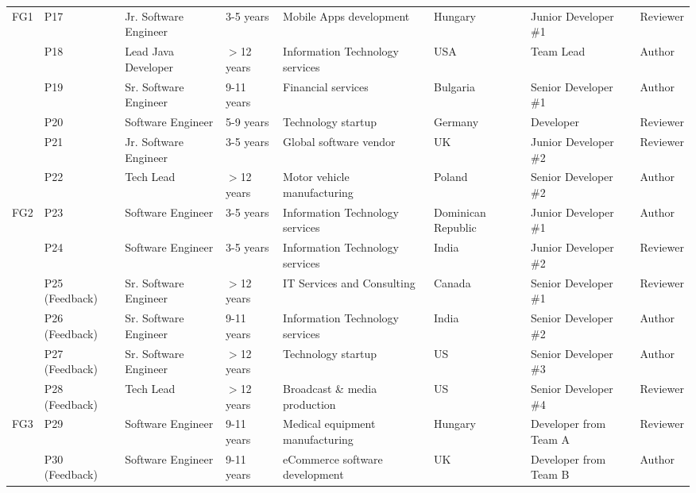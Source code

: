 {\begin{landscape}
\begin{longtable}{clp{2.5cm}lllp{3.1cm}l}
         \multirow{6}{*}{FG1} & P17 & Jr. Software Engineer & 3-5 years & Mobile Apps development & Hungary & Junior Developer \#1 & Reviewer\\ 
                              & P18 & Lead Java Developer & $>$12 years & Information Technology services & USA & Team Lead & Author\\ 
                              & P19 & Sr. Software Engineer & 9-11 years & Financial services & Bulgaria & Senior Developer \#1 & Author\\ 
                              & P20 & Software Engineer & 5-9 years & Technology startup & Germany & Developer & Reviewer\\ 
                              & P21 & Jr. Software Engineer & 3-5 years & Global software vendor & UK & Junior Developer \#2 & Reviewer\\ 
                              & P22 & Tech Lead & $>$12 years & Motor vehicle manufacturing & Poland & Senior Developer \#2 & Author\\  \hline
         \multirow{6}{*}{FG2} & P23 & Software Engineer & 3-5 years & Information Technology services & Dominican Republic & Junior Developer \#1 & Author\\ 
                              & P24 & Software Engineer & 3-5 years & Information Technology services & India & Junior Developer \#2 & Reviewer\\ 
                              & P25 (Feedback)& Sr. Software Engineer & $>$12 years & IT Services and Consulting & Canada & Senior Developer \#1 & Reviewer\\ 
                              & P26 (Feedback)& Sr. Software Engineer & 9-11 years & Information Technology services & India & Senior Developer \#2 & Author\\ 
                              & P27 (Feedback)& Sr. Software Engineer & $>$12 years & Technology startup & US & Senior Developer \#3 & Author\\ 
                              & P28 (Feedback)& Tech Lead & $>$12 years & Broadcast  \& media production & US & Senior Developer \#4 & Reviewer\\  \hline
         \multirow{6}{*}{FG3} & P29 & Software Engineer & 9-11 years & Medical equipment manufacturing & Hungary & Developer from Team A & Reviewer\\ 
                              & P30 (Feedback)& Software Engineer & 9-11 years & eCommerce software development & UK & Developer from Team B & Author\\ 

\end{longtable}
\end{landscape}}
